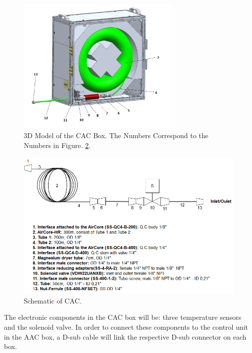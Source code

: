 \documentclass[a4paper,12pt,twoside]{article}
\begin{document}
\begin{figure}[H]
    \centering
    \includegraphics[width=0.7\textwidth]{4-experiment-design/img/Mechanical/CAC_interior_labels.jpg}
    \caption{3D Model of the CAC Box. The Numbers Correspond to the Numbers in Figure. \ref{fig:CAC-schematic}.}
    \label{fig:CAC-cad-model}
\end{figure}

\begin{figure}[H]
    \centering
    \includegraphics[width=1\textwidth]{4-experiment-design/img/Mechanical/CAC-schematic.PNG}
    \caption{Schematic of CAC.}
    \label{fig:CAC-schematic}
\end{figure}
\smallskip
The electronic components in the CAC box will be: three temperature sensors and the solenoid valve. In order to connect these components to the control unit in the AAC box, a D-sub cable will link the respective D-sub connector on each box.
\end{document}
